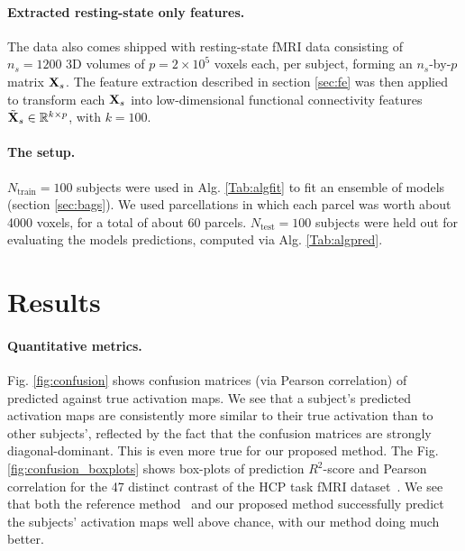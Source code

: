 \paragraph{Extracted resting-state only features.}
The data also comes shipped with resting-state fMRI data consisting of $n_s = 1200$ 3D volumes
of $p = 2 \times 10^5$ voxels each, per subject, forming an $n_s$-by-$p$ matrix $\mathbf{X}_s$.
The feature extraction described in section \ref{sec:fe} was then applied to transform each $\mathbf{X}_s$
into low-dimensional functional connectivity features $\tilde{\mathbf{X}}_s \in \mathbb R^{k \times p}$, with $k=100$.
\paragraph{The setup.}
$N_{\text{train}} = 100$ subjects were used in Alg. \ref{Tab:algfit} to fit an ensemble of models
(section \ref{sec:bags}). We used parcellations in which each parcel was worth about 4000 voxels,
for a total of about 60 parcels.
$N_{\text{test}} = 100$ subjects were held out for evaluating the models predictions,
computed via Alg. \ref{Tab:algpred}.

\section{Results}
\paragraph{Quantitative metrics.} Fig. \ref{fig:confusion} shows
confusion matrices (via Pearson correlation) of predicted against true activation maps. We see that a subject's predicted activation
maps are consistently more similar to their true activation than to other subjects', reflected by the fact that the confusion matrices are strongly diagonal-dominant.
This is even more true for our proposed method. The Fig. \ref{fig:confusion_boxplots} shows box-plots of prediction $R^2$-score and Pearson correlation
for the 47 distinct contrast of the HCP task fMRI dataset~\citep{VanEssen20122222}. We see that both the reference method~\citep{tavor2016task} and our proposed method
successfully predict the subjects' activation maps well above chance, with our method doing much better.

